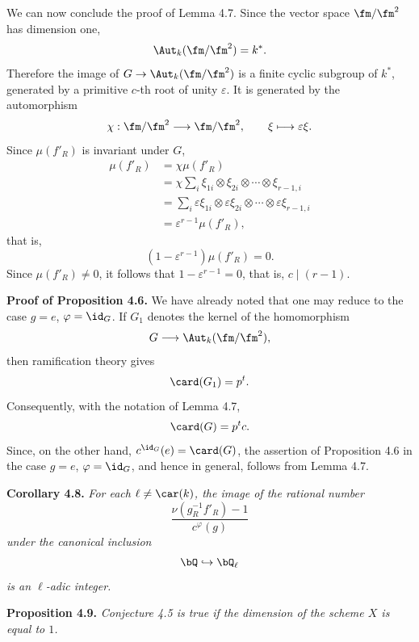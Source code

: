 We can now conclude the proof of Lemma 4.7. Since the vector space
$\fm/\fm^2$ has dimension one,
\[
\Aut_k(\fm/\fm^2)=k^*.
\]
Therefore the image of $G\to\Aut_k(\fm/\fm^2)$ is a finite cyclic
subgroup of $k^*$, generated by a primitive $c$-th root of unity
$\varepsilon$. It is generated by the automorphism
\[
\chi:\fm/\fm^2\longrightarrow\fm/\fm^2,
\qquad \xi\longmapsto\varepsilon\xi.
\]
Since $\mu(f'_R)$ is invariant under $G$,
\[
\begin{aligned}
\mu(f'_R)
&=\chi\mu(f'_R)\\
&=\chi\sum_i\xi_{1i}\otimes\xi_{2i}\otimes\cdots\otimes\xi_{r-1,i}\\
&=\sum_i\varepsilon\xi_{1i}\otimes\varepsilon\xi_{2i}
  \otimes\cdots\otimes\varepsilon\xi_{r-1,i}\\
&=\varepsilon^{r-1}\mu(f'_R),
\end{aligned}
\]
that is,
\[
(1-\varepsilon^{r-1})\mu(f'_R)=0.
\]
Since $\mu(f'_R)\ne0$, it follows that
$1-\varepsilon^{r-1}=0$, that is, $c\mid(r-1)$.

\medskip
\noindent
\textbf{Proof of Proposition 4.6.} We have already noted that one may reduce to the case $g=e$, $\varphi=\id_G$. If $G_1$ denotes the kernel of the homomorphism
\[
G\longrightarrow\Aut_k(\fm/\fm^2),
\]
then ramification theory gives
\[
\card(G_1)=p^t.
\]
Consequently, with the notation of Lemma 4.7,
\[
\card(G)=p^tc.
\]
Since, on the other hand, $c^{\id_G}(e)=\card(G)$, the assertion of Proposition 4.6 in the case $g=e$, $\varphi=\id_G$, and hence in general, follows from Lemma 4.7.

\medskip
\noindent
\textbf{Corollary 4.8.} \emph{For each $\ell\ne\car(k)$, the image of the rational number
\[
\frac{\nu(g_R^{-1}f'_R)-1}{c^\varphi(g)}
\]
under the canonical inclusion
\[
\bQ\hookrightarrow \bQ_\ell
\]
is an $\ell$-adic integer.}

\medskip
\noindent
\textbf{Proposition 4.9.} \emph{Conjecture 4.5 is true if the dimension of the scheme $X$ is equal to $1$.}


